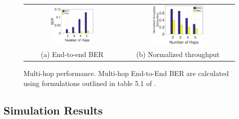 \begin{figure}
\centering
\begin{tabular}{cc}
   \hspace*{-12pt} \includegraphics[width=0.47\textwidth]{figures/ber_bar_160}&
   \hspace*{-12pt}\includegraphics[width=0.47\textwidth]{figures/th_bar_160}\\
      \hspace*{-12pt} (a) End-to-end BER &
 \hspace*{-12pt} (b) Normalized throughput
      \end{tabular}
       \caption{Multi-hop performance. Multi-hop End-to-End BER are calculated using formulations outlined in table 5.1 of \cite{zhang2017cross}.} %
    \label{fig:experiment_ber}
\end{figure}
  





\subsection{Simulation Results}

